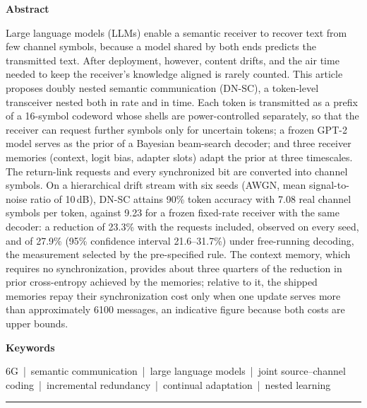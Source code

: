 \noindent\textbf{\sffamily Abstract}\par\smallskip
\noindent Large language models (LLMs) enable a semantic receiver to recover text from few channel symbols, because a model shared by both ends predicts the transmitted text. After deployment, however, content drifts, and the air time needed to keep the receiver's knowledge aligned is rarely counted. This article proposes doubly nested semantic communication (DN-SC), a token-level transceiver nested both in rate and in time. Each token is transmitted as a prefix of a 16-symbol codeword whose shells are power-controlled separately, so that the receiver can request further symbols only for uncertain tokens; a frozen GPT-2 model serves as the prior of a Bayesian beam-search decoder; and three receiver memories (context, logit bias, adapter slots) adapt the prior at three timescales. The return-link requests and every synchronized bit are converted into channel symbols. On a hierarchical drift stream with six seeds (AWGN, mean signal-to-noise ratio of 10\,dB), DN-SC attains 90\% token accuracy with 7.08 real channel symbols per token, against 9.23 for a frozen fixed-rate receiver with the same decoder: a reduction of 23.3\% with the requests included, observed on every seed, and of 27.9\% (95\% confidence interval 21.6--31.7\%) under free-running decoding, the measurement selected by the pre-specified rule. The context memory, which requires no synchronization, provides about three quarters of the reduction in prior cross-entropy achieved by the memories; relative to it, the shipped memories repay their synchronization cost only when one update serves more than approximately 6100 messages, an indicative figure because both costs are upper bounds.

\medskip
\noindent\textbf{\sffamily Keywords}\par\smallskip
\noindent 6G \,|\, semantic communication \,|\, large language models \,|\, joint source--channel coding \,|\, incremental redundancy \,|\, continual adaptation \,|\, nested learning

\noindent\rule{\textwidth}{0.4pt}
\vspace{4pt}
